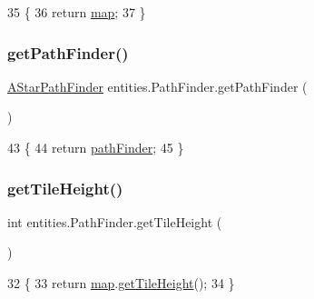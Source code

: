 \begin{DoxyCode}
35                         \{
36         \textcolor{keywordflow}{return} \mbox{\hyperlink{classentities_1_1_path_finder_a55024473615fc2ba75d7faf5dcd78b3f}{map}};
37     \}
\end{DoxyCode}
\mbox{\label{classentities_1_1_path_finder_a25a38e5f0d878079b9fde1260dc5074a}} 
\subsubsection{\texorpdfstring{get\+Path\+Finder()}{getPathFinder()}}
{\footnotesize\ttfamily \mbox{\hyperlink{classorg_1_1newdawn_1_1slick_1_1util_1_1pathfinding_1_1_a_star_path_finder}{A\+Star\+Path\+Finder}} entities.\+Path\+Finder.\+get\+Path\+Finder (\begin{DoxyParamCaption}{ }\end{DoxyParamCaption})\hspace{0.3cm}{\ttfamily [inline]}}


\begin{DoxyCode}
43                                            \{
44         \textcolor{keywordflow}{return} \mbox{\hyperlink{classentities_1_1_path_finder_a3ee55002f6ed410109207b43757e93f7}{pathFinder}};
45     \}
\end{DoxyCode}
\mbox{\label{classentities_1_1_path_finder_a3193394c83000018da44409a33f8720c}} 
\subsubsection{\texorpdfstring{get\+Tile\+Height()}{getTileHeight()}}
{\footnotesize\ttfamily int entities.\+Path\+Finder.\+get\+Tile\+Height (\begin{DoxyParamCaption}{ }\end{DoxyParamCaption})\hspace{0.3cm}{\ttfamily [inline]}}


\begin{DoxyCode}
32                           \{
33     \textcolor{keywordflow}{return} \mbox{\hyperlink{classentities_1_1_path_finder_a55024473615fc2ba75d7faf5dcd78b3f}{map}}.\mbox{\hyperlink{classentities_1_1_map_a43c2e5888d77a6b400cc6dd2c9aa1769}{getTileHeight}}();
34 \}
\end{DoxyCode}
\mbox{\label{classentities_1_1_path_finder_a35e329ef378f48050d49408140412e7f}} 
